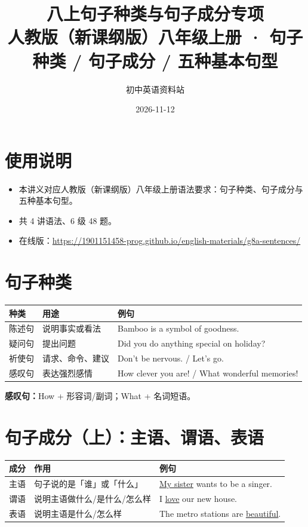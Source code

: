 \documentclass[11pt,a4paper]{ctexart}
\title{\textbf{八上句子种类与句子成分专项}\\[4pt]
\large 人教版（新课纲版）八年级上册 · 句子种类 / 句子成分 / 五种基本句型}
\author{初中英语资料站}
\date{2026-11-12}
\begin{document}
\maketitle

\section*{使用说明}
\begin{itemize}[leftmargin=1.4em]
\item 本讲义对应人教版（新课纲版）八年级上册语法要求：句子种类、句子成分与五种基本句型。
\item 共 4 讲语法、6 级 48 题。
\item 在线版：\url{https://1901151458-prog.github.io/english-materials/g8a-sentences/}
\end{itemize}

\section{句子种类}
\begin{center}
\begin{tabular}{p{2.6cm}p{4.2cm}p{6.6cm}}
\hline
\textbf{种类} & \textbf{用途} & \textbf{例句}\\
\hline
陈述句 & 说明事实或看法 & Bamboo is a symbol of goodness.\\
疑问句 & 提出问题 & Did you do anything special on holiday?\\
祈使句 & 请求、命令、建议 & Don't be nervous. / Let's go.\\
感叹句 & 表达强烈感情 & How clever you are! / What wonderful memories!\\
\hline
\end{tabular}
\end{center}
\textbf{感叹句：}How + 形容词/副词；What + 名词短语。

\section{句子成分（上）：主语、谓语、表语}
\begin{center}
\begin{tabular}{p{2.6cm}p{5.6cm}p{5.2cm}}
\hline
\textbf{成分} & \textbf{作用} & \textbf{例句}\\
\hline
主语 & 句子说的是「谁」或「什么」 & \underline{My sister} wants to be a singer.\\
谓语 & 说明主语做什么/是什么/怎么样 & I \underline{love} our new house.\\
表语 & 说明主语是什么/怎么样 & The metro stations are \underline{beautiful}.\\
\hline
\end{tabular}
\end{center}
\end{document}

